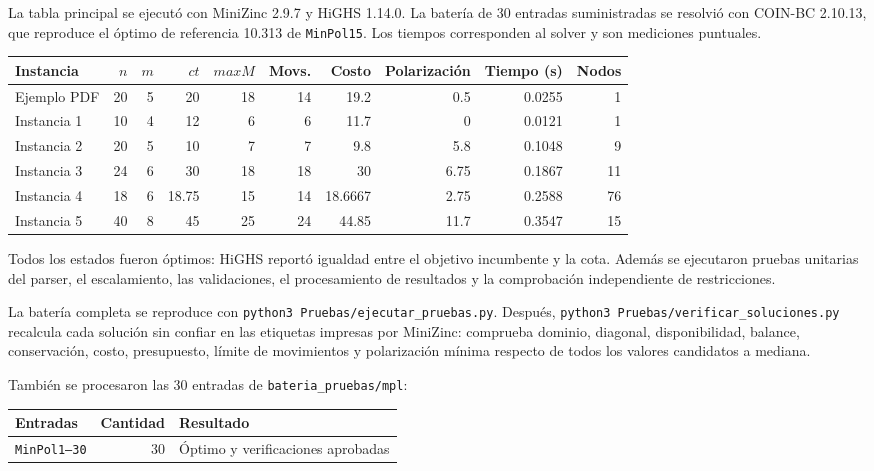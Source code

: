 \documentclass[11pt,letterpaper]{article}
\begin{document}
La tabla principal se ejecutó con MiniZinc 2.9.7 y HiGHS 1.14.0. La batería
de 30 entradas suministradas se resolvió con COIN-BC 2.10.13, que reproduce
el óptimo de referencia 10.313 de \texttt{MinPol15}. Los tiempos corresponden
al solver y son mediciones puntuales.

\begin{center}
\scriptsize
\begin{tabular}{lrrrrrrrrr}
\toprule
Instancia & \(n\) & \(m\) & \(ct\) & \(maxM\) & Movs. & Costo &
Polarización & Tiempo (s) & Nodos\\
\midrule
Ejemplo PDF & 20 & 5 & 20 & 18 & 14 & 19.2 & 0.5 & 0.0255 & 1\\
Instancia 1 & 10 & 4 & 12 & 6 & 6 & 11.7 & 0 & 0.0121 & 1\\
Instancia 2 & 20 & 5 & 10 & 7 & 7 & 9.8 & 5.8 & 0.1048 & 9\\
Instancia 3 & 24 & 6 & 30 & 18 & 18 & 30 & 6.75 & 0.1867 & 11\\
Instancia 4 & 18 & 6 & 18.75 & 15 & 14 & 18.6667 & 2.75 & 0.2588 & 76\\
Instancia 5 & 40 & 8 & 45 & 25 & 24 & 44.85 & 11.7 & 0.3547 & 15\\
\bottomrule
\end{tabular}
\end{center}

Todos los estados fueron óptimos: HiGHS reportó igualdad entre el objetivo
incumbente y la cota. Además se ejecutaron pruebas unitarias del parser,
el escalamiento, las validaciones, el procesamiento de resultados y la
comprobación independiente de restricciones.

La batería completa se reproduce con
\texttt{python3 Pruebas/ejecutar\_pruebas.py}. Después,
\texttt{python3 Pruebas/verificar\_soluciones.py} recalcula cada solución sin
confiar en las etiquetas impresas por MiniZinc: comprueba dominio, diagonal,
disponibilidad, balance, conservación, costo, presupuesto, límite de
movimientos y polarización mínima respecto de todos los valores candidatos a
mediana.

También se procesaron las 30 entradas de
\texttt{bateria\_pruebas/mpl}:

\begin{center}
\begin{tabular}{lrl}
\toprule
Entradas & Cantidad & Resultado\\
\midrule
\texttt{MinPol1--30} & 30 & Óptimo y verificaciones aprobadas\\
\bottomrule
\end{tabular}
\end{center}
\end{document}
